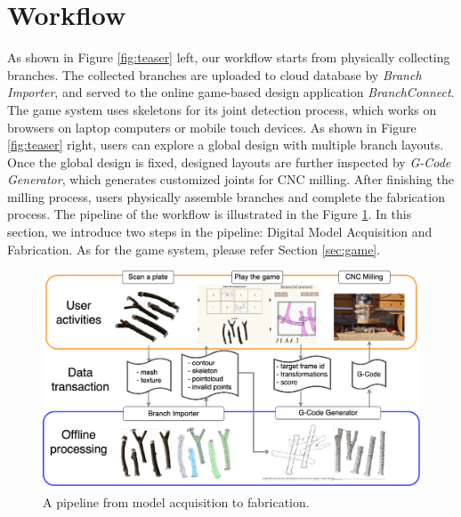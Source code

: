\section{Workflow}
As shown in Figure \ref{fig:teaser} left, our workflow starts from physically collecting branches.
The collected branches are uploaded to cloud database by \textit{Branch Importer}, and served to the online game-based design application \textit{BranchConnect}.
The game system uses skeletons for its joint detection process, which works on browsers on laptop computers or mobile touch devices.
As shown in Figure \ref{fig:teaser} right, users can explore a global design with multiple branch layouts.
Once the global design is fixed, designed layouts are further inspected by \textit{G-Code Generator}, which generates customized joints for CNC milling.
After finishing the milling process, users physically assemble branches and complete the fabrication process.
The pipeline of the workflow is illustrated in the Figure \ref{fig:pipeline}.
In this section, we introduce two steps in the pipeline: Digital Model Acquisition and Fabrication.
As for the game system, please refer Section \ref{sec:game}.

\begin{figure}[ht]
  \begin{center}
    \includegraphics[width = 0.4\paperwidth]{images/workflow/pipeline.png}
    \caption{A pipeline from model acquisition to fabrication.}
    \label{fig:pipeline}
  \end{center}
\end{figure}

